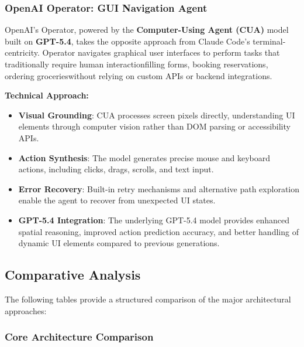 \subsubsection{OpenAI Operator: GUI Navigation Agent}

OpenAI's Operator, powered by the \textbf{Computer-Using Agent (CUA)} model built on \textbf{GPT-5.4}, takes the opposite approach from Claude Code's terminal-centricity. Operator navigates graphical user interfaces to perform tasks that traditionally require human interactionfilling forms, booking reservations, ordering grocerieswithout relying on custom APIs or backend integrations.

\textbf{Technical Approach:}

\begin{itemize}
    \item \textbf{Visual Grounding}: CUA processes screen pixels directly, understanding UI elements through computer vision rather than DOM parsing or accessibility APIs.
    \item \textbf{Action Synthesis}: The model generates precise mouse and keyboard actions, including clicks, drags, scrolls, and text input.
    \item \textbf{Error Recovery}: Built-in retry mechanisms and alternative path exploration enable the agent to recover from unexpected UI states.
    \item \textbf{GPT-5.4 Integration}: The underlying GPT-5.4 model provides enhanced spatial reasoning, improved action prediction accuracy, and better handling of dynamic UI elements compared to previous generations.

\end{itemize}
\subsection{Comparative Analysis}

The following tables provide a structured comparison of the major architectural approaches:

\subsubsection{Core Architecture Comparison}

